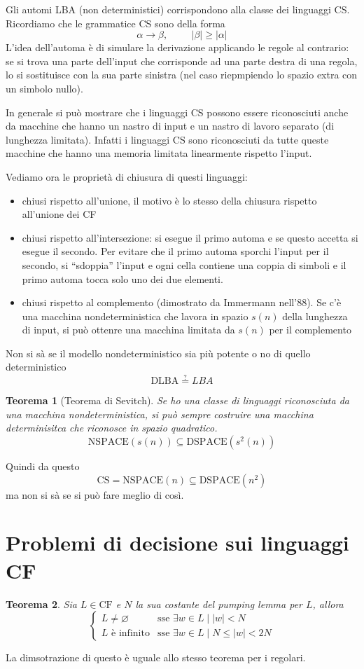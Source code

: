 \documentclass[12pt]{article}
\newtheorem{teorema}{Teorema}
\begin{document}
\begin{Ŧcolorbox}[breakable]
Gli automi LBA (non deterministici) corrispondono alla classe dei linguaggi CS.
Ricordiamo che le grammatice CS sono della forma
$$ \alpha \rightarrow \beta, \hspace{1cm} |\beta| \geq |\alpha | $$
L'idea dell'automa è di simulare la derivazione applicando le regole al contrario: se si trova una parte dell'input che corrisponde ad una parte destra di una regola, lo si sostituisce con la sua parte sinistra (nel caso riepmpiendo lo spazio extra con un simbolo nullo).

In generale si può mostrare che i linguaggi CS possono essere riconosciuti anche da macchine che hanno un nastro di input e un nastro di lavoro separato (di lunghezza limitata).
Infatti i linguaggi CS sono riconosciuti da tutte queste macchine che hanno una memoria limitata linearmente rispetto l'input.

Vediamo ora le proprietà di chiusura di questi linguaggi:
\begin{itemize}
	\item chiusi rispetto all'unione, il motivo è lo stesso della chiusura rispetto all'unione dei CF
	\item chiusi rispetto all'intersezione: si esegue il primo automa e se questo accetta si esegue il secondo.
		Per evitare che il primo automa sporchi l'input per il secondo, si ``sdoppia'' l'input e ogni cella contiene una coppia di simboli e il primo automa tocca solo uno dei due elementi.
	\item chiusi rispetto al complemento (dimostrato da Immermann nell'88).
		Se c'è una macchina nondeterministica che lavora in spazio $s(n)$ della lunghezza di input, si può ottenre una macchina limitata da $s(n)$ per il complemento
\end{itemize}
Non si sà se il modello nondeterministico sia più potente o no di quello deterministico
$$ \text{DLBA} \overset{?}{=} LBA $$
\begin{teorema}[Teorema di Sevitch]
	Se ho una classe di linguaggi riconosciuta da una macchina nondeterministica, si può sempre costruire una macchina determinisitca che riconosce in spazio quadratico.
	$$ \text{NSPACE}(s(n)) \subseteq \text{DSPACE}(s^2(n)) $$
\end{teorema}
Quindi da questo 
$$ \text{CS} = \text{NSPACE}(n) \subseteq \text{DSPACE}(n^2) $$
ma non si sà se si può fare meglio di così.

\section{Problemi di decisione sui linguaggi CF}
\begin{teorema}
	Sia $L \in \text{CF}$ e $N$ la sua costante del pumping lemma per $L$, allora
	$$ \begin{cases}
		L \neq \varnothing & \text{sse } \exists w \in L \mid |w| < N \\
		L \text{ è infinito} & \text{sse } \exists w \in L \mid N \leq |w| < 2N
	\end{cases}
	$$
\end{teorema}
La dimsotrazione di questo è uguale allo stesso teorema per i regolari.


\end{Ŧcolorbox}
\end{document}
